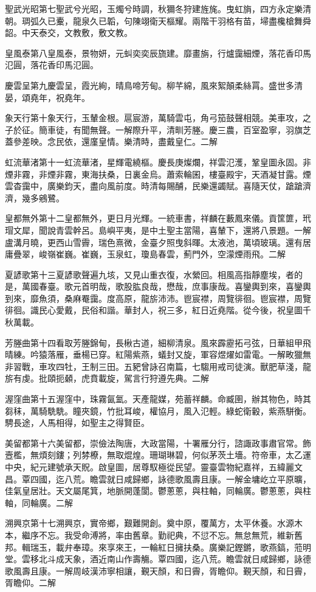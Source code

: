 \begin{pinyinscope}
聖武光昭第七聖武兮光昭，玉燭兮時調，秋獮冬狩建旌旄。曳虹旓，四方永定樂清朝。琱弧久已櫜，龍泉久已韜，句陳翊衛天樞耀。兩階干羽格有苗，埽盡欃槍舞舜韶。中天泰交，文教敷，敷文教。

皇風泰第八皇風泰，景物妍，元虯奕奕辰旒建。靡畫旃，行爐靄細煙，落花香印馬氾圓，落花香印馬氾圓。

慶雲呈第九慶雲呈，霞光絢，晴鳥啼芳甸。柳芊綿，風來絮顛柔絲罥。盛世多清晏，頌堯年，祝堯年。

象天行第十象天行，玉輦金根。扈宸游，萬騎雲屯，角弓笳鼓聲相競。美車攻，之子於征。簡車徒，有聞無聲。一解際升平，清甽芳塍。慶三農，百室盈寧，羽旗芝蓋參差映。念民依，還廑皇情。樂清時，盡戴皇仁。二解

虹流華渚第十一虹流華渚，星輝電繞樞。慶長庚燦爛，祥雲氾濩，鞏皇圖永固。非煙非霧，非煙非霧，東海扶桑，日裏金烏。蕭索輪囷，樓臺殿宇，天酒凝甘露。煙雲杳靄中，廣樂鈞天，盡向風前度。時清每賜酺，民樂還蠲賦。喜隨天仗，蹌蹌濟濟，幾多鵷鷺。

皇都無外第十二皇都無外，更日月光輝。一統車書，祥麟在藪鳳來儀。貢筐篚，玳瑁文犀，聞說青雲幹呂。島嶼平夷，是中土聖主當陽，喜輦下，還將八景題。一解盧溝月曉，更西山雪霽，瑞色熹微，金臺夕照曳斜暉。太液池，萬頃玻璃。還有居庸疊翠，峻嶺崔巍。崔巍，玉泉虹，瓊島春雲，薊門外，空濛煙雨飛。二解

夏諺歌第十三夏諺歌聲遍九垓，又見山重衣復，水縈回。相風高指靜塵埃，者的是，萬國春臺。歌元首明哉，歌股肱良哉，懋哉，庶事康哉。喜鑾輿到來，喜鑾輿到來，靡魚須，桑麻罨靄。度高原，龍旂沛沛。鬯宸襟，周覽徘徊。鬯宸襟，周覽徘徊。識民心愛戴，民俗和諧。華封人，祝三多，紅日近堯階。從今後，祝皇圖千秋萬載。

芳塍曲第十四看取芳塍錦甸，長楸古道，細柳清泉。風來霹靂拓弓弦，日華組甲飛晴練。吟猿落雁，垂楊已穿。紅陽紫燕，蟻封又旋，軍容煜燿如雷電。一解畋獵無非習戰，車攻四牡，王制三田。五豝曾詠召南篇，七騶用戒司徒演。獸肥草淺，龍旂有虔。批頤扼顙，虎賁載旋，駕言行狩遵先典。二解

渥窪曲第十五渥窪中，珠霧氤氳。天產龍媒，苑蓄祥麟。命臧圉，辦其物色，時其芻秣，萬騎駪駪。瞳夾鏡，竹批耳峻，權協月，風入氾輕。綠蛇衛轂，紫燕駢衡。騁長途，人馬相得，如聖主之得賢臣。

美留都第十六美留都，崇儉法陶唐，大政當陽，十署雁分行，諮諏政事肅官常。飾壼檻，無煩刻鏤；列棼橑，無取焜煌。珊瑚琳碧，何似茅茨土墻。符帝車，太乙運中央，紀元建號承天貺。啟皇圖，居尊馭極從民望。靈臺雲物紀嘉祥，五緯麗文昌。覃四國，迄八荒。瞻雲就日咸歸鄉，詠德歌風壽且康。一解金墉屹立平原曠，佳氣皇居壯。天文屬尾箕，地脈開蓬閬。鬱蔥蔥，與柱軸，同輪廣。鬱蔥蔥，與柱軸，同輪廣。二解

溯興京第十七溯興京，實帝鄉，艱難開創。奠中原，覆萬方，太平休養。水源木本，繼序不忘。我受命溥將，率由舊章。勤祀典，不愆不忘。無怠無荒，維新舊邦。輯瑞玉，載弁奉璋。來享來王，一輪紅日擁扶桑。廣樂記鏗鏘，歌燕鎬，蒞明堂。雲移北斗成天象，酒近南山作壽觴。覃四國，迄八荒。瞻雲就日咸歸鄉，詠德歌風壽且康。一解周岐漢沛寧相讓，覲天顏，和日霽，胥瞻仰。覲天顏，和日霽，胥瞻仰。二解


\end{pinyinscope}

